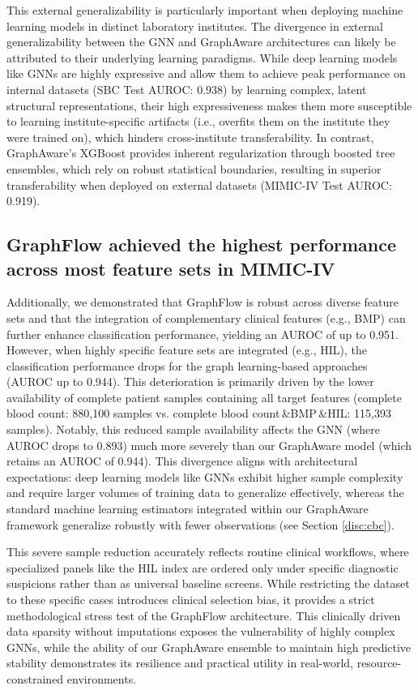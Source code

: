 \documentclass[pdflatex,sn-mathphys-num,lineno]{sn-jnl}
\theoremstyle{thmstyleone}%
\theoremstyle{thmstyletwo}%
\theoremstyle{thmstylethree}%
\begin{document}
This external generalizability is particularly important when deploying machine learning models in distinct laboratory institutes. The divergence in external generalizability between the GNN and GraphAware architectures can likely be attributed to their underlying learning paradigms. While deep learning models like GNNs are highly expressive and allow them to achieve peak performance on internal datasets (SBC Test AUROC: 0.938) by learning complex, latent structural representations, their high expressiveness makes them more susceptible to learning institute-specific artifacts (i.e., overfits them on the institute they were trained on), which hinders cross-institute transferability. In contrast, GraphAware's XGBoost provides inherent regularization through boosted tree ensembles, which rely on robust statistical boundaries, resulting in superior transferability when deployed on external datasets (MIMIC-IV Test AUROC: 0.919).

\subsection{GraphFlow achieved the highest performance across most feature sets in MIMIC-IV}\label{disc:other_features}
Additionally, we demonstrated that GraphFlow is robust across diverse feature sets and that the integration of complementary clinical features (e.g., BMP) can further enhance classification performance, yielding an AUROC of up to 0.951. However, when highly specific feature sets are integrated (e.g., HIL), the classification performance drops for the graph learning-based approaches (AUROC up to 0.944). This deterioration is primarily driven by the lower availability of complete patient samples containing all target features (complete blood count: 880,100 samples vs. complete blood count\,\&BMP\,\&HIL: 115,393 samples). Notably, this reduced sample availability affects the GNN (where AUROC drops to 0.893) much more severely than our GraphAware model (which retains an AUROC of 0.944). This divergence aligns with architectural expectations: deep learning models like GNNs exhibit higher sample complexity and require larger volumes of training data to generalize effectively, whereas the standard machine learning estimators integrated within our GraphAware framework generalize robustly with fewer observations (see Section \ref{disc:cbc}). 

This severe sample reduction accurately reflects routine clinical workflows, where specialized panels like the HIL index are ordered only under specific diagnostic suspicions rather than as universal baseline screens. While restricting the dataset to these specific cases introduces clinical selection bias, it provides a strict methodological stress test of the GraphFlow architecture. This clinically driven data sparsity without imputations exposes the vulnerability of highly complex GNNs, while the ability of our GraphAware ensemble to maintain high predictive stability demonstrates its resilience and practical utility in real-world, resource-constrained environments.
\end{document}
